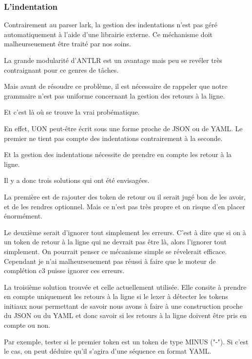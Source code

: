 \documentclass[
    iict, %
    il, %
]{heig-tb}
\begin{document}
\subsubsection{L'indentation}


Contrairement au parser lark, la gestion des indentations n'est pas géré automatiquement à l'aide d'une librairie externe.
Ce méchanisme doit malheurseuement être traité par nos soins.

La grande modularité d'ANTLR est un avantage mais peu se revéler très contraignant pour ce genres de tâches.

Mais avant de résoudre ce problème, il est nécessaire de rappeler que notre grammaire n'est pas uniforme concernant la gestion des retours à la ligne. 

Et c'est là où se trouve la vrai probématique.

En effet, UON peut-être écrit sous une forme proche de JSON ou de YAML. Le premier ne tient pas compte des indentations contrairement à la seconde.

Et la gestion des indentations nécessite de prendre en compte les retour à la ligne. %

Il y a donc trois solutions qui ont été envisagées.

La première est de rajouter des token de retour ou il serait jugé bon de les avoir, et de les rendres optionnel.
Mais ce n'est pas très propre et on risque d'en placer énormément.

Le deuxième serait d'ignorer tout simplement les erreurs. C'est à dire que si on à un token de retour à la ligne qui ne devrait pas être là, alors l'ignorer tout simplement.
On pourrait penser ce mécanisme simple se révelerait efficace. Cependant je n'ai malheurseuement pas réussi à faire que le moteur de complétion c3
puisse ignorer ces erreurs.

La troisième solution trouvée et celle actuellement utilisée. Elle consite à prendre en compte uniquement les retours à la ligne si le lexer à détecter les tokens initiaux
nous permettant de savoir nous avons à faire à une construction proche du JSON ou du YAML et donc savoir si les retours à la ligne doivent être pris en compte ou non.

Par exemple, tester si le premier token est un token de type MINUS ("-"). Si c'est le cas, on peut déduire qu'il s'agira d'une séquence en format YAML.
\end{document}
